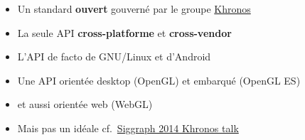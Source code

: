 \begin{frame}
\begin{columns}
\begin{column}{.2\textwidth}
\begin{center}
      \end{center}
    \end{column}
    \begin{column}{.8\textwidth}
      \begin{itemize}
      \item Un standard \textbf{ouvert} gouverné par le groupe \href{http://www.khronos.org}{Khronos}
      \item La seule API \textbf{cross-platforme} et \textbf{cross-vendor} %
      \item L'API de facto de GNU/Linux et d'Android
      \item Une API orientée desktop (OpenGL) et embarqué (OpenGL ES)
      \item et aussi orientée web (WebGL)
      \item \alert{Mais pas un idéale} cf.\ \href{https://www.khronos.org/assets/uploads/developers/library/2014-siggraph-bof/OpenGL-Ecosystem-BOF_Aug14.pdf}{Siggraph 2014 Khronos talk}
      \end{itemize}
    \end{column}
  \end{columns}
\end{frame}

